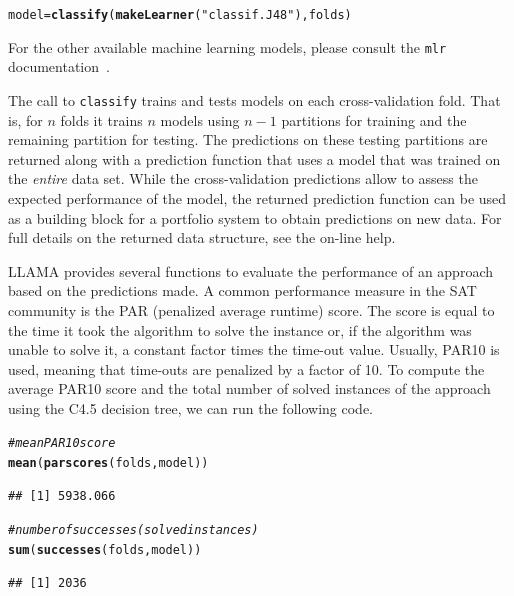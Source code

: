 \documentclass{article}\usepackage[]{graphicx}\usepackage[]{color}
\makeatletter
\newcommand{\hlstr}[1]{\textcolor[rgb]{0.192,0.494,0.8}{#1}}%
\newcommand{\hlcom}[1]{\textcolor[rgb]{0.678,0.584,0.686}{\textit{#1}}}%
\newcommand{\hlstd}[1]{\textcolor[rgb]{0.345,0.345,0.345}{#1}}%
\newcommand{\hlkwb}[1]{\textcolor[rgb]{0.69,0.353,0.396}{#1}}%
\newcommand{\hlkwd}[1]{\textcolor[rgb]{0.737,0.353,0.396}{\textbf{#1}}}%
\newenvironment{kframe}{%
 \def\at@end@of@kframe{}%
 \ifinner\ifhmode%
  \def\at@end@of@kframe{\end{minipage}}%
  \begin{minipage}{\columnwidth}%
 \fi\fi%
 \def\FrameCommand##1{\hskip\@totalleftmargin \hskip-\fboxsep
 \colorbox{shadecolor}{##1}\hskip-\fboxsep
     \hskip-\linewidth \hskip-\@totalleftmargin \hskip\columnwidth}%
 \MakeFramed {\advance\hsize-\width
   \@totalleftmargin\z@ \linewidth\hsize
   \@setminipage}}%
 {\par\unskip\endMakeFramed%
 \at@end@of@kframe}
\newenvironment{knitrout}{}{} %
\makeatother
\begin{document}
\begin{knitrout}
\color{fgcolor}\begin{kframe}
\begin{alltt}
\hlstd{model} \hlkwb{=} \hlkwd{classify}\hlstd{(}\hlkwd{makeLearner}\hlstd{(}\hlstr{"classif.J48"}\hlstd{), folds)}
\end{alltt}
\end{kframe}
\end{knitrout}

For the other available machine learning models, please consult the
\lstinline{mlr} documentation~\cite{mlr}.

The call to \lstinline{classify} trains and tests models on each
cross-validation fold. That is, for $n$ folds it trains $n$ models using $n-1$
partitions for training and the remaining partition for testing. The predictions
on these testing partitions are returned along with a prediction function that
uses a model that was trained on the \emph{entire} data set. While the
cross-validation predictions allow to assess the expected performance of the
model, the returned prediction function can be used as a building block for a
portfolio system to obtain predictions on new data. For full details on the
returned data structure, see the on-line help.

LLAMA provides several functions to evaluate the performance of an approach
based on the predictions made. A common performance measure in the SAT community
is the PAR (penalized average runtime) score. The score is equal to the time it
took the algorithm to solve the instance or, if the algorithm was unable to
solve it, a constant factor times the time-out value. Usually, PAR10 is used,
meaning that time-outs are penalized by a factor of 10. To compute the average
PAR10 score and the total number of solved instances of the approach using the
C4.5 decision tree, we can run the following code.

\begin{knitrout}
\color{fgcolor}\begin{kframe}
\begin{alltt}
\hlcom{# mean PAR10 score}
\hlkwd{mean}\hlstd{(}\hlkwd{parscores}\hlstd{(folds, model))}
\end{alltt}
\begin{verbatim}
## [1] 5938.066
\end{verbatim}
\begin{alltt}
\hlcom{# number of successes (solved instances)}
\hlkwd{sum}\hlstd{(}\hlkwd{successes}\hlstd{(folds, model))}
\end{alltt}
\begin{verbatim}
## [1] 2036
\end{verbatim}
\end{kframe}
\end{knitrout}
\end{document}
